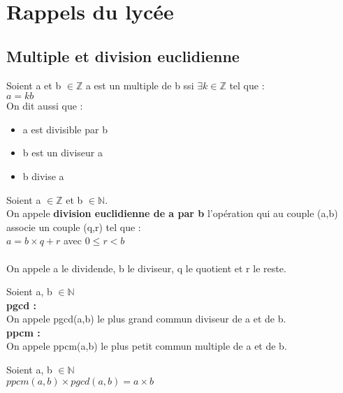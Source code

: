 \chapter{Rappels du lyc\'ee}
\section{Multiple et division euclidienne}
\begin{madef}
Soient a et b $\in \mathbb{Z} $
\newline
a est un multiple de b ssi $\exists k \in \mathbb{Z}$ tel que : \\
$a = kb $
\\ On dit aussi que  :
\begin{itemize}[label=, font=\color{black}]
	\item a est divisible par b 
	\item b est un diviseur a
	\item b divise a
\end{itemize}
\end{madef}


\begin{madef}
Soient a $\in \mathbb{Z}$ et b $\in \mathbb{N}$. \\
On appele \textbf{division euclidienne de a par b} l'op\'eration qui au couple (a,b) associe un couple (q,r) tel que : \\
$a = b \times q + r$ avec $0 \le r < b$ \\
\\
On appele a le dividende, b le diviseur, q le quotient et r le reste. 
\end{madef}

\begin{madef}
Soient a, b $\in \mathbb{N}$ \\
\textbf{pgcd : }\\
On appele pgcd(a,b) le plus grand commun diviseur de a et de b. \\
\textbf{ppcm : }\\
On appele ppcm(a,b) le plus petit commun multiple de a et de b. \\
\end{madef}

\begin{maprop}
Soient a, b $\in \mathbb{N}$ \\
$ ppcm(a,b) \times pgcd(a, b) = a \times b$
\end{maprop}

